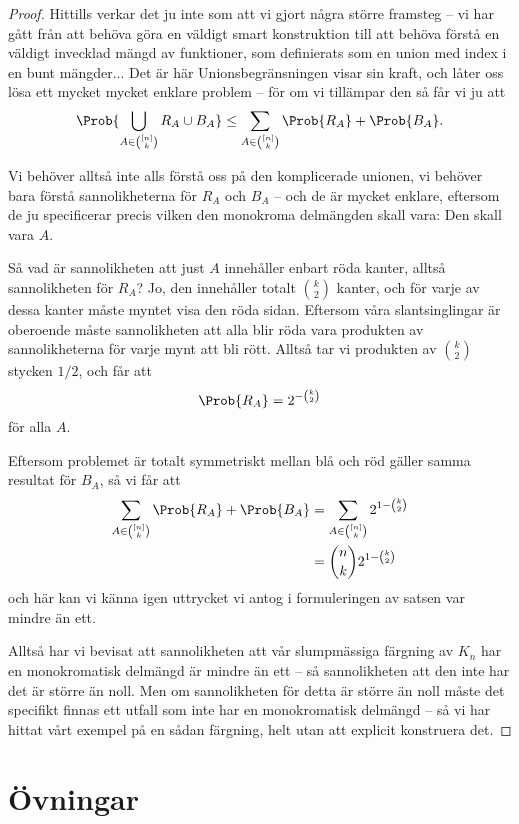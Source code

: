 \documentclass[nobib]{tufte-handout}
\begin{document}
\begin{proposition}
\begin{proof}
        Hittills verkar det ju inte som att vi gjort några större framsteg -- vi har gått från att behöva göra en väldigt smart konstruktion till att behöva förstå en väldigt invecklad mängd av funktioner, som definierats som en union med index i en bunt mängder... Det är här Unionsbegränsningen visar sin kraft, och låter oss lösa ett mycket mycket enklare problem -- för om vi tillämpar den så får vi ju att
        $$\Prob{\bigcup_{A \in \binom{[n]}{k}} R_A \cup B_A} \leq \sum_{A\in \binom{[n]}{k}} \Prob{R_A} + \Prob{B_A}.$$

        Vi behöver alltså inte alls förstå oss på den komplicerade unionen, vi behöver bara förstå sannolikheterna för $R_A$ och $B_A$ -- och de är mycket enklare, eftersom de ju specificerar precis vilken den monokroma delmängden skall vara: Den skall vara $A$.

        Så vad är sannolikheten att just $A$ innehåller enbart röda kanter, alltså sannolikheten för $R_A$? Jo, den innehåller totalt $\binom{k}{2}$ kanter, och för varje av dessa kanter måste myntet visa den röda sidan. Eftersom våra slantsinglingar är oberoende måste sannolikheten att alla blir röda vara produkten av sannolikheterna för varje mynt att bli rött. Alltså tar vi produkten av $\binom{k}{2}$ stycken $1/2$, och får att
        $$\Prob{R_A} = 2^{-\binom{k}{2}}$$
        för alla $A$. 
        
        Eftersom problemet är totalt symmetriskt mellan blå och röd gäller samma resultat för $B_A$, så vi får att
        \begin{align*}
            \sum_{A\in \binom{[n]}{k}} \Prob{R_A} + \Prob{B_A} &= \sum_{A\in \binom{[n]}{k}} 2^{1-\binom{k}{2}}\\
            &= \binom{n}{k}2^{1-\binom{k}{2}}
        \end{align*}
        och här kan vi känna igen uttrycket vi antog i formuleringen av satsen var mindre än ett.

        Alltså har vi bevisat att sannolikheten att vår slumpmässiga färgning av $K_n$ har en monokromatisk delmängd är mindre än ett -- så sannolikheten att den inte har det är större än noll. Men om sannolikheten för detta är större än noll måste det specifikt finnas ett utfall som inte har en monokromatisk delmängd -- så vi har hittat vårt exempel på en sådan färgning, helt utan att explicit konstruera det.
    \end{proof}
\end{proposition}

\section{Övningar}
\end{document}

